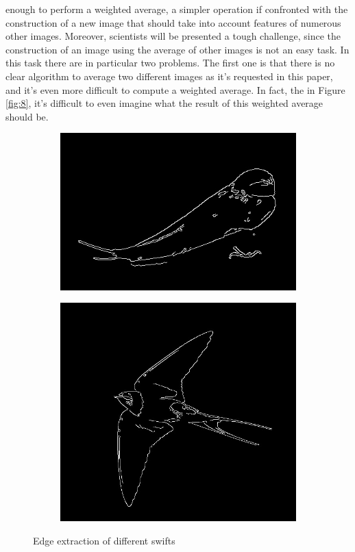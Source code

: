 \documentclass[conference]{IEEEtran}
\begin{document}
			enough to perform a weighted average, a simpler operation if confronted with the construction of a new image that should take into account features of numerous other images.
			Moreover, scientists will be presented a tough challenge, since the construction of an image using the average of other images is not an easy task. In this task there are in particular two problems. The first 
			one is that there is no clear algorithm to average two different images as it's requested in this paper, 
			and it's even more difficult to compute a weighted average. In fact, the in Figure \ref{fig:8}, it's difficult to even imagine what the result of this weighted average should be. 
			
			\begin{figure}[!t]
				\centering
				\begin{subfigure}[!t]{0.48\linewidth}
					\centerline{\includegraphics[width=0.9\linewidth]{imgs/swallow_edges.jpg}}
				\end{subfigure}
				\begin{subfigure}[!t]{0.48\linewidth}
					\centerline{\includegraphics[height=0.4\textheight]{imgs/swallow_2_edges.jpg}}
				\end{subfigure}
				\caption{Edge extraction of different swifts}
				\label{fig:9}
			\end{figure}
			
\end{document}
